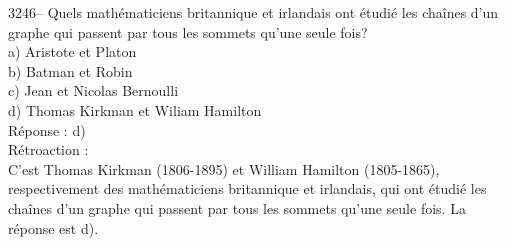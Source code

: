 \documentclass[letterpaper, 12pt]{article}
\begin{document}
3246-- Quels math\'ematiciens britannique et irlandais ont \'etudi\'e les cha\^ines d'un graphe qui passent par tous les sommets qu'une seule fois?\\

a) Aristote et Platon\\
b) Batman et Robin\\
c) Jean et Nicolas Bernoulli\\
d) Thomas Kirkman et Wiliam Hamilton\\

R\'eponse : d)\\

R\'etroaction :\\
C'est Thomas Kirkman (1806-1895) et William Hamilton (1805-1865), respectivement des math\'ematiciens britannique et irlandais, qui ont \'etudi\'e les cha\^ines d'un graphe qui passent par tous les sommets qu'une seule fois. La r\'eponse est d).
\end{document}
